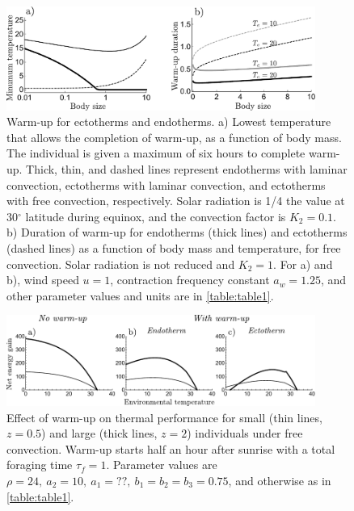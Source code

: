 \begin{figure}
\centering \includegraphics[width=0.9\textwidth]{fig3}
\caption{
    \setstretch{\stretchby}
	Warm-up for ectotherms and endotherms.
	a) Lowest temperature that allows the completion of warm-up, as a function of body mass.
	The individual is given a maximum of six hours to complete warm-up.
    Thick, thin, and dashed lines represent endotherms with laminar convection, ectotherms with laminar convection, and ectotherms with free convection, respectively.
    Solar radiation is 1/4 the value at 30$^\circ$ latitude during equinox, and the convection factor is $K_2 = 0.1$.
    b) Duration of warm-up for endotherms (thick lines) and ectotherms (dashed lines) as a function of body mass and temperature, for free convection.  %
    Solar radiation is not reduced and $K_2 = 1$.
    For a) and b), wind speed $u = 1$, contraction frequency constant $a_w = 1.25$, and other parameter values and units are in \cref{table:table1}.
}
\label{fig3}
\end{figure}
%
\begin{figure}
\centering \includegraphics[width=0.9\textwidth]{fig4}
\caption{
    \setstretch{\stretchby}
    Effect of warm-up on thermal performance for small (thin lines, $z = 0.5$) and large (thick lines, $z = 2$) individuals under free convection.
    Warm-up starts half an hour after sunrise with a total foraging time $\tau_f = 1$.
    Parameter values are $\rho = 24,\ a_2 = 10,\ a_1 = ??,\ b_1 = b_2 = b_3 = 0.75$, and otherwise as in \cref{table:table1}. %
}
\label{fig4}
\end{figure}

